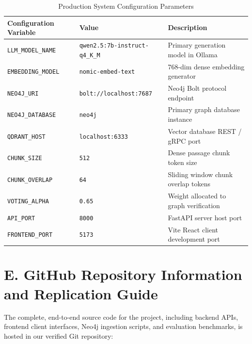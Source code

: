 \documentclass[12pt,a4paper,oneside]{report}
\begin{document}
\begin{table}[htbp]
\centering
\caption{Production System Configuration Parameters}
\label{tab:config_parameters}
\begin{tabular}{lll}
\toprule
\textbf{Configuration Variable} & \textbf{Value} & \textbf{Description} \\
\midrule
\texttt{LLM\_MODEL\_NAME} & \texttt{qwen2.5:7b-instruct-q4\_K\_M} & Primary generation model in Ollama \\
\texttt{EMBEDDING\_MODEL} & \texttt{nomic-embed-text} & 768-dim dense embedding generator \\
\texttt{NEO4J\_URI} & \texttt{bolt://localhost:7687} & Neo4j Bolt protocol endpoint \\
\texttt{NEO4J\_DATABASE} & \texttt{neo4j} & Primary graph database instance \\
\texttt{QDRANT\_HOST} & \texttt{localhost:6333} & Vector database REST / gRPC port \\
\texttt{CHUNK\_SIZE} & \texttt{512} & Dense passage chunk token size \\
\texttt{CHUNK\_OVERLAP} & \texttt{64} & Sliding window chunk overlap tokens \\
\texttt{VOTING\_ALPHA} & \texttt{0.65} & Weight allocated to graph verification \\
\texttt{API\_PORT} & \texttt{8000} & FastAPI server host port \\
\texttt{FRONTEND\_PORT} & \texttt{5173} & Vite React client development port \\
\bottomrule
\end{tabular}
\end{table}

\section*{E. GitHub Repository Information and Replication Guide}
The complete, end-to-end source code for the project, including backend APIs, frontend client interfaces, Neo4j ingestion scripts, and evaluation benchmarks, is hosted in our verified Git repository:

\begin{center}
\end{center}
\end{document}
